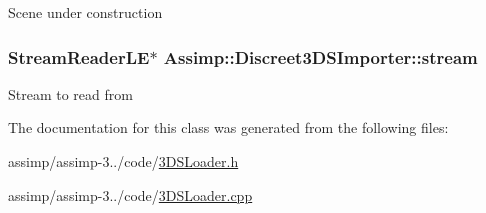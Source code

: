 Scene under construction \hypertarget{class_assimp_1_1_discreet3_d_s_importer_a44f2ddb67a27b6cd5d82fb843061b33e}{
\subsubsection[{stream}]{\setlength{\rightskip}{0pt plus 5cm}Stream\+Reader\+L\+E$\ast$ Assimp\+::\+Discreet3\+D\+S\+Importer\+::stream\hspace{0.3cm}{\ttfamily [protected]}}}\label{class_assimp_1_1_discreet3_d_s_importer_a44f2ddb67a27b6cd5d82fb843061b33e}
Stream to read from 

The documentation for this class was generated from the following files\+:\begin{DoxyCompactItemize}
\item 
assimp/assimp-\/3../code/\hyperlink{3_d_s_loader_8h}{3\+D\+S\+Loader.\+h}\item 
assimp/assimp-\/3../code/\hyperlink{3_d_s_loader_8cpp}{3\+D\+S\+Loader.\+cpp}\end{DoxyCompactItemize}
